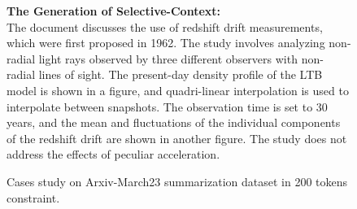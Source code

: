 \begin{figure*}[htb]
\begin{tcolorbox}
    \textbf{The Generation of Selective-Context:}\\
    The document discusses the use of redshift drift measurements, which were first proposed in 1962. The study involves analyzing non-radial light rays observed by three different observers with non-radial lines of sight. The present-day density profile of the LTB model is shown in a figure, and quadri-linear interpolation is used to interpolate between snapshots. The observation time is set to 30 years, and the mean and fluctuations of the individual components of the redshift drift are shown in another figure. The study does not address the effects of peculiar acceleration.
    \end{tcolorbox}
    \caption{Cases study on Arxiv-March23 summarization dataset in 200 tokens constraint.}
    \label{fig:case_arxiv}
\end{figure*}

